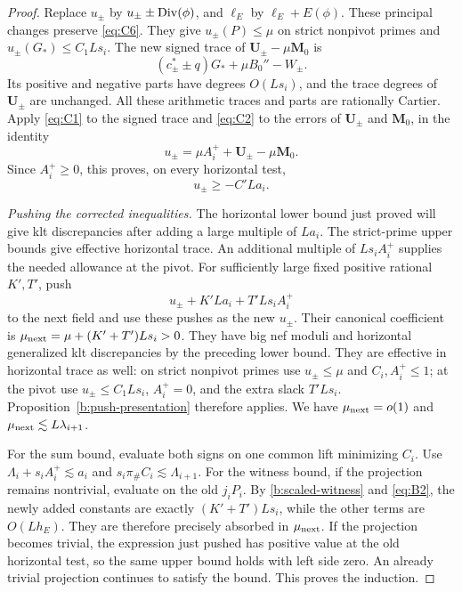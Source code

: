 \begin{proof}
Replace \(u_\pm\) by \(u_\pm\pm\operatorname{Div}(\phi)\), and
\(\ell_E\) by \(\ell_E+E(\phi)\). These principal changes preserve
\eqref{eq:C6}. They give \(u_\pm(P)\le\mu\) on strict nonpivot
primes and \(u_\pm(G_*)\le C_1Ls_i\). The new signed trace of
\(\mathbf U_\pm-\mu\mathbf M_0\) is
\[
       (c_\pm^*\pm q)G_*+\mu B_0''-W_\pm.
\]
Its positive and negative parts have degrees \(O(Ls_i)\), and
the trace degrees of \(\mathbf U_\pm\) are unchanged. All these
arithmetic traces and parts are rationally Cartier.
Apply \eqref{eq:C1} to the signed trace and \eqref{eq:C2} to
the errors of \(\mathbf U_\pm\) and \(\mathbf M_0\), in the identity
\[
 u_\pm=\mu A_i^++\mathbf U_\pm-\mu\mathbf M_0.
\]
Since \(A_i^+\ge0\), this proves, on every horizontal test,
\[
                              u_\pm\ge-C'La_i.
\]

\smallskip\noindent
\emph{Pushing the corrected inequalities.}
The horizontal lower bound just proved will give klt discrepancies after
adding a large multiple of $La_i$. The strict-prime upper bounds give
effective horizontal trace. An additional multiple of $Ls_iA_i^+$
supplies the needed allowance at the pivot.
For sufficiently large fixed positive rational \(K',T'\), push
\[
                    u_\pm+K'La_i+T'Ls_iA_i^+
\]
to the next field and use these pushes as the new \(u_\pm\).
Their canonical coefficient is
\(\mu_{\rm next}=\mu+(K'+T')Ls_i>0\).
They have big nef moduli and horizontal generalized klt
discrepancies by the preceding lower bound.
They are effective in horizontal trace as well:
on strict nonpivot primes use \(u_\pm\le\mu\) and
\(C_i,A_i^+\le1\); at the pivot use \(u_\pm\le C_1Ls_i\),
\(A_i^+=0\), and the extra slack \(T'Ls_i\).
Proposition~\ref{b:push-presentation} therefore applies.
We have \(\mu_{\rm next}=o(1)\) and
\(\mu_{\rm next}\lesssim L\lambda_{i+1}\).

For the sum bound, evaluate both signs on one common lift
minimizing \(C_i\). Use
\(\Lambda_i+s_iA_i^+\lesssim a_i\) and
\(s_i\pi_\#C_i\lesssim\Lambda_{i+1}\).
For the witness bound, if the projection remains nontrivial,
evaluate on the old \(j_iP_i\). By \eqref{b:scaled-witness}
and \eqref{eq:B2}, the newly added constants are exactly
\((K'+T')Ls_i\), while the other terms are \(O(Lh_E)\).
They are therefore precisely absorbed in \(\mu_{\rm next}\).
If the projection becomes trivial, the expression just pushed
has positive value at the old horizontal test, so the same upper
bound holds with left side zero. An already trivial projection
continues to satisfy the bound. This proves the induction.


\end{proof}

